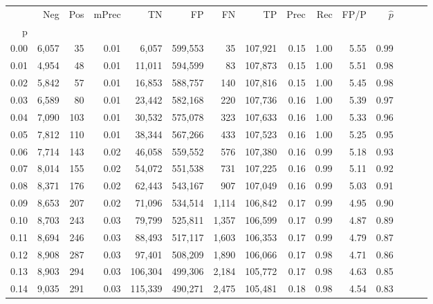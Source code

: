 \begin{tabular}{rrrrrrrrrrrrrrr}
\toprule
{} &    Neg &    Pos & mPrec &       TN &       FP &       FN &       TP &  Prec &   Rec &  FP/P & $\hat{p}$ \\
p    &        &        &       &          &          &          &          &       &       &       &           \\
\midrule
0.00 &  6,057 &     35 &  0.01 &    6,057 &  599,553 &       35 &  107,921 &  0.15 &  1.00 &  5.55 &      0.99 \\
0.01 &  4,954 &     48 &  0.01 &   11,011 &  594,599 &       83 &  107,873 &  0.15 &  1.00 &  5.51 &      0.98 \\
0.02 &  5,842 &     57 &  0.01 &   16,853 &  588,757 &      140 &  107,816 &  0.15 &  1.00 &  5.45 &      0.98 \\
0.03 &  6,589 &     80 &  0.01 &   23,442 &  582,168 &      220 &  107,736 &  0.16 &  1.00 &  5.39 &      0.97 \\
0.04 &  7,090 &    103 &  0.01 &   30,532 &  575,078 &      323 &  107,633 &  0.16 &  1.00 &  5.33 &      0.96 \\
0.05 &  7,812 &    110 &  0.01 &   38,344 &  567,266 &      433 &  107,523 &  0.16 &  1.00 &  5.25 &      0.95 \\
0.06 &  7,714 &    143 &  0.02 &   46,058 &  559,552 &      576 &  107,380 &  0.16 &  0.99 &  5.18 &      0.93 \\
0.07 &  8,014 &    155 &  0.02 &   54,072 &  551,538 &      731 &  107,225 &  0.16 &  0.99 &  5.11 &      0.92 \\
0.08 &  8,371 &    176 &  0.02 &   62,443 &  543,167 &      907 &  107,049 &  0.16 &  0.99 &  5.03 &      0.91 \\
0.09 &  8,653 &    207 &  0.02 &   71,096 &  534,514 &    1,114 &  106,842 &  0.17 &  0.99 &  4.95 &      0.90 \\
0.10 &  8,703 &    243 &  0.03 &   79,799 &  525,811 &    1,357 &  106,599 &  0.17 &  0.99 &  4.87 &      0.89 \\
0.11 &  8,694 &    246 &  0.03 &   88,493 &  517,117 &    1,603 &  106,353 &  0.17 &  0.99 &  4.79 &      0.87 \\
0.12 &  8,908 &    287 &  0.03 &   97,401 &  508,209 &    1,890 &  106,066 &  0.17 &  0.98 &  4.71 &      0.86 \\
0.13 &  8,903 &    294 &  0.03 &  106,304 &  499,306 &    2,184 &  105,772 &  0.17 &  0.98 &  4.63 &      0.85 \\
0.14 &  9,035 &    291 &  0.03 &  115,339 &  490,271 &    2,475 &  105,481 &  0.18 &  0.98 &  4.54 &      0.83 \\

\end{tabular}
